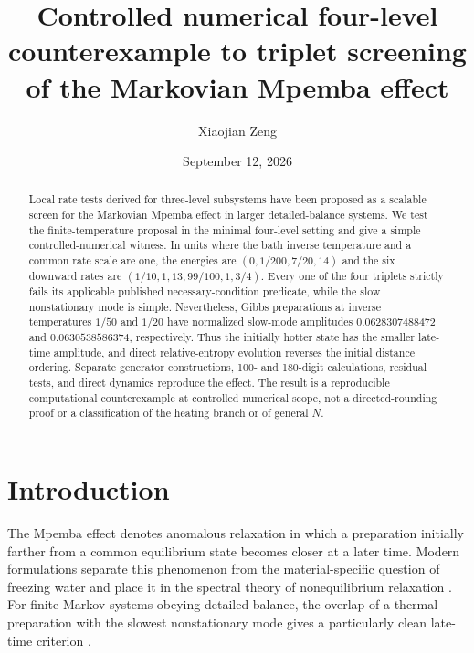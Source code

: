 \documentclass[aps,pre,reprint,superscriptaddress,nofootinbib]{revtex4-2}
\begin{document}
\title{Controlled numerical four-level counterexample to triplet screening of the Markovian Mpemba effect}

\author{Xiaojian Zeng}

\date{September 12, 2026}

\begin{abstract}
Local rate tests derived for three-level subsystems have been proposed as a scalable
screen for the Markovian Mpemba effect in larger detailed-balance systems.  We test
the finite-temperature proposal in the minimal four-level setting and give a simple
controlled-numerical witness.  In units where the bath inverse temperature and a
common rate scale are one, the energies are
$(0,1/200,7/20,14)$ and the six downward rates are
$(1/10,1,13,99/100,1,3/4)$.  Every one of the four triplets strictly fails its
applicable published necessary-condition predicate, while the slow nonstationary
mode is simple.  Nevertheless, Gibbs preparations at inverse temperatures
$1/50$ and $1/20$ have normalized slow-mode amplitudes
$0.0628307488472$ and $0.0630538586374$, respectively.  Thus the initially hotter
state has the smaller late-time amplitude, and direct relative-entropy evolution
reverses the initial distance ordering.  Separate generator constructions,
100- and 180-digit calculations, residual tests, and direct dynamics reproduce the
effect.  The result is a reproducible computational counterexample at controlled
numerical scope, not a directed-rounding proof or a classification of the heating
branch or of general $N$.
\end{abstract}

\maketitle

\section{Introduction}

The Mpemba effect denotes anomalous relaxation in which a preparation initially
farther from a common equilibrium state becomes closer at a later time.  Modern
formulations separate this phenomenon from the material-specific question of
freezing water and place it in the spectral theory of nonequilibrium relaxation
\cite{Teza2026}.  For finite Markov systems obeying detailed balance, the overlap of
a thermal preparation with the slowest nonstationary mode gives a particularly
clean late-time criterion \cite{LuRaz2017,Klich2019}.
\end{document}

